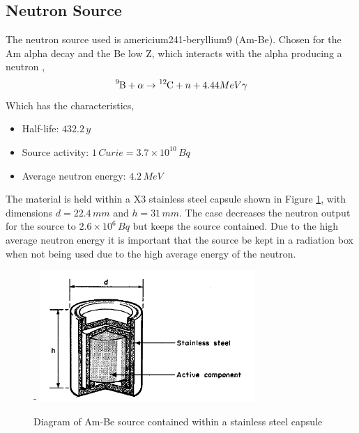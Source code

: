 \documentclass[a4paper]{article}
\begin{document}
\subsection{Neutron Source}
The neutron source used is americium241-beryllium9 (Am-Be). Chosen for the Am alpha decay and the Be low Z, which interacts with the alpha producing a neutron \cite{nrc},
\begin{equation}
    \ce{^{9}B} + \alpha \rightarrow \ce{^{12}C} + n + 4.44MeV \gamma
\end{equation}
Which has the characteristics,
\begin{itemize}
    \item[] {Half-life: $432.2\,y$}
    \item[] {Source activity: $1\,Curie = 3.7 \times 10^{10}\,Bq$}
    \item[] {Average neutron energy: $4.2\,MeV$}
\end{itemize}
The material is held within a X3 stainless steel capsule shown in Figure \ref{fig:ambe}, with dimensions $d = 22.4\,mm$ and $h = 31\,mm$. The case decreases the neutron output for the source to $2.6 \times 10^{6}\,Bq$ but keeps the source contained. Due to the high average neutron energy it is important that the source be kept in a radiation box when not being used due to the high average energy of the neutron.
\begin{figure}[H]-
    \centering
    \includegraphics[height=5cm]{plots/ambe.png}
    \caption{Diagram of Am-Be source contained within a stainless steel capsule \cite{LORCH1973585}}
    \label{fig:ambe}
\end{figure}
\end{document}
